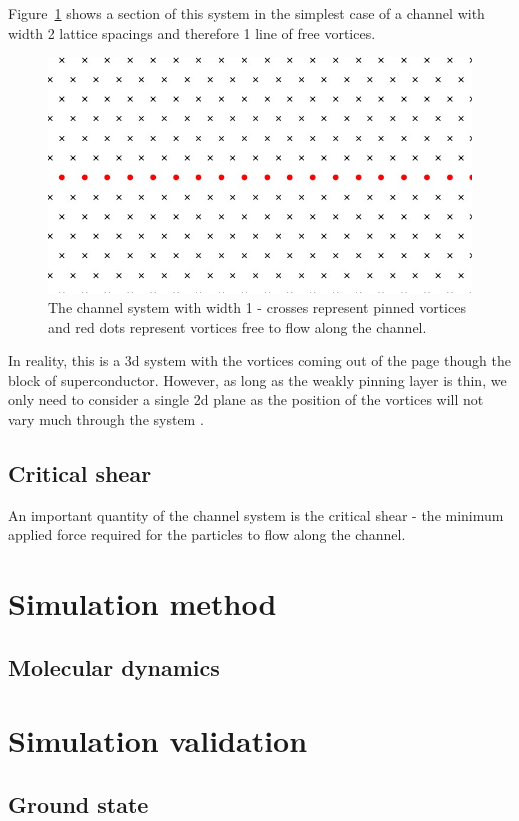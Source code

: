 \documentclass{article}
\numberwithin{equation}{section}
\begin{document}
Figure~\ref{fig:channel_system} shows a section of this system in the simplest case of a channel with width 2 lattice spacings and therefore 1 line of free vortices.
\begin{figure}[htb]
    \centering
    \includegraphics[width=0.8\linewidth]{results/Figures/channel_drawing - cropped.jpg}
    \caption{The channel system with width 1 - crosses represent pinned vortices and red dots represent vortices free to flow along the channel.}
    \label{fig:channel_system}
\end{figure}
In reality, this is a 3d system with the vortices coming out of the page though the block of superconductor. However, as long as the weakly pinning layer is thin, we only need to consider a single 2d plane as the position of the vortices will not vary much through the system \cite{Gartlan2020NovelFibres}.
 
\subsection{Critical shear}
An important quantity of the channel system is the critical shear - the minimum applied force required for the particles to flow along the channel. 

\section{Simulation method}
\subsection{Molecular dynamics}

\section{Simulation validation}
\subsection{Ground state}
\end{document}
